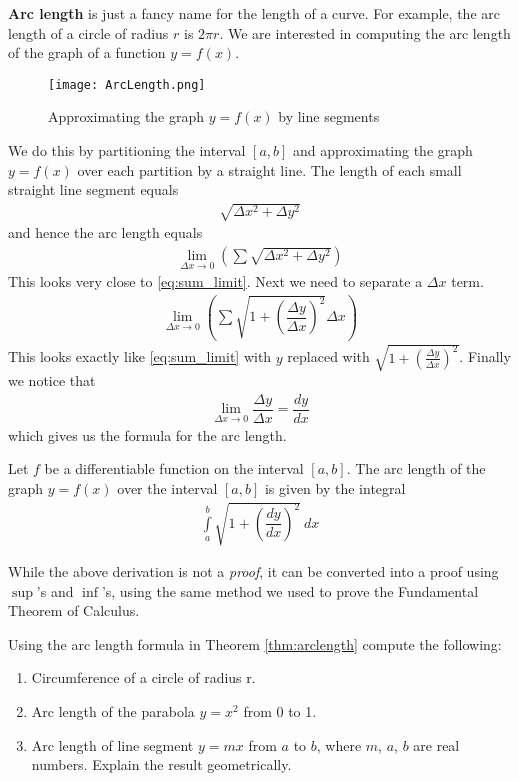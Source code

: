 {\bf Arc length} is just a fancy name for the length of a curve. For example, the arc length of a circle of radius $r$ is $2 \pi r$. We are interested in computing the arc length of the graph of a function $y=f(x)$.
\begin{figure}[H]
  \centering
  \texttt{[image: ArcLength.png]}
  \caption*{Approximating the graph $y=f(x)$ by line segments}
\end{figure}
We do this by partitioning the interval $[a,b]$ and approximating the graph $ y = f(x)$ over each partition by a straight line. The length of each small straight line segment equals
\begin{align*}
  \sqrt{\Delta x^2 + \Delta y^2}
\end{align*}
and hence the arc length equals
\begin{align*}
  \lim \limits_{\Delta x \rightarrow 0}  \left(\sum \sqrt{\Delta x^2 + \Delta y^2}\right)
\end{align*}
This looks very close to \eqref{eq:sum_limit}. Next we need to separate a $\Delta x$ term.
\begin{align*}
  \lim \limits_{\Delta x \rightarrow 0} \left(\sum \sqrt{1 + \left(\dfrac{\Delta y}{\Delta x}\right)^2} \Delta x \right)
\end{align*}
This looks exactly like \eqref{eq:sum_limit} with $y$ replaced with $\sqrt{1 + \left(\frac{\Delta y}{\Delta x}\right)^2}$. Finally we notice that
\begin{align*}
  \lim \limits_{\Delta x \rightarrow 0} \dfrac{\Delta y}{\Delta x} = \dfrac{dy}{dx}
\end{align*}
which gives us the formula for the arc length.
\begin{theorem}
  \label{thm:arclength}
  Let $f$ be a differentiable function on the interval $[a,b]$. The arc length of the graph $y = f(x)$ over the interval $[a,b]$ is given by the integral
  \begin{align*}
    \int \limits_a^b \sqrt{1 + \left(\dfrac{dy}{dx} \right)^2}  \: dx
  \end{align*}
\end{theorem}
While the above derivation is not a {\it proof}, it can be converted into a proof using $\sup$'s and $\inf$'s, using the same method we used to prove the Fundamental Theorem of Calculus.

\begin{exercise}
  Using the arc length formula in Theorem \ref{thm:arclength} compute the following:
  \begin{enumerate}
    \item Circumference of a circle of radius r.
    \item Arc length of the parabola $y = x^2$ from 0 to 1.
    \item Arc length of line segment $y = m x$ from $a$ to $b$, where $m$, $a$, $b$ are real numbers. Explain the result geometrically.
  \end{enumerate}
\end{exercise}

